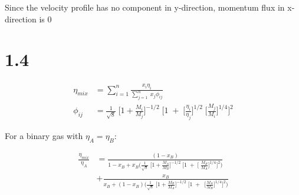 \documentclass[11pt]{article}
\begin{document}
Since the velocity profile has no component in y-direction, momentum
flux in x-direction is 0

    \section{1.4}\label{section}

    \begin{align}
\eta_{mix} &= \sum^{n}_{i=1} \frac{x_i \eta_i}{\sum^{n}_{j=1} \; x_j \phi_{ij}} \\
\phi_{ij} &= \frac{1}{\sqrt{8}} \; \Bigg[ 1+\frac{M_i}{M_j} \Bigg] ^{-1/2} \; \Bigg[ 1 \; + \; \Big[ \frac{\eta_i}{\eta_j} \Big]^{1/2} \; \Big[ \frac{M_j}{M_i} \Big]^{1/4} \Bigg] ^2
\end{align}

    For a binary gas with \(\eta_A=\eta_B\):

\begin{align}
\frac{\eta_{mix}}{\eta_A} &=  \frac{(1-x_B)}{ 1-x_B + x_B \Bigg(\frac{1}{\sqrt{8}} \; \Bigg[ 1+\frac{M_A}{M_B} \Bigg] ^{-1/2} \; \Bigg[ 1 \; + \; \Big[  \; \frac{M_B}{M_A} \Big]^{1/4} \Bigg] ^2 \Bigg) } \nonumber \\
&+  \frac{x_B}{ x_B + (1-x_B) \Bigg( \frac{1}{\sqrt{8}} \; \Bigg[ 1+\frac{M_B}{M_A} \Bigg] ^{-1/2} \; \Bigg[ 1 \; + \;  \; \Big[ \frac{M_A}{M_B} \Big]^{1/4} \Bigg] ^2 \Bigg)}
\end{align}
\end{document}
